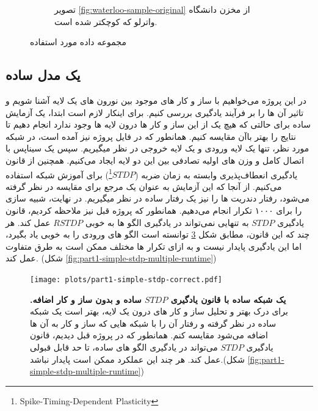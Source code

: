 \begin{figure}[H]
\begin{adjustbox}{minipage=\linewidth,scale=0.5}
\begin{subfigure}[b]{0.4\textwidth}
                    \caption{تصویر 
                    \ref{fig:waterloo-sample-original}
                    از مخزن دانشگاه واترلو که کوچکتر شده است.}
                    \label{fig:waterloo-sample-resized}
                \end{subfigure}
            \end{adjustbox}
            \caption{مجموعه داده مورد استفاده}
            \label{fig:dataset}
        \end{figure}
    \subsection{یک مدل ساده}
        در این پروژه می‌خواهیم با ساز و کار های موجود بین نورون های یک لایه آشنا شویم و تاثیر آن ها را بر فرآیند یادگیری بررسی کنیم. برای اینکار لازم است ابتدا، یک آزمایش ساده برای حالتی که هیچ یک از این ساز و کار ها درون لایه ها وجود ندارد انجام دهیم تا نتایج را بهتر با‌آن مقایسه کنیم. همانطور که در فایل پروژه نیز آمده است، در شبکه مورد نظر، تنها یک لایه ورودی و یک لایه خروجی در نظر میگیریم. سپس یک سیناپس با اتصال کامل و وزن های اولیه تصادفی بین این دو لایه ایجاد می‌کنیم. همچنین از قانون یادگیری انعطاف‌پذیری وابسته به زمان ضربه 
        ($STDP$\footnote{Spike-Timing-Dependent Plasticity})
        برای آموزش شبکه استفاده می‌کنیم. از آنجا که این آزمایش به عنوان یک مرجع برای مقایسه در نظر گرفته می‌شود، رفتار دندریت ها را نیز یک رفتار ساده در نظر میگیریم. در نهایت، شبیه سازی را برای ۱۰۰۰ تکرار انجام می‌دهیم.
        همانطور که پروژه قبل نیز ملاحظه کردیم، قانون یادگیری 
        $STDP$ 
        به تنهایی نمی‌تواند در یادگیری الگو ها به خوبی 
        $RSTDP$ 
        عمل کند. هر چند که این قانون، مطابق شکل 
        \ref{fig:part1-simple-stdp-correct} 
        توانسته است الگو های ورودی را به خوبی یاد بگیرد، اما این یادگیری پایدار نیست و به ازای تکرار ها مختلف ممکن است به طرق متفاوت عمل کند.
        (شکل \ref{fig:part1-simple-stdp-multiple-runtime})
        \begin{figure}[!ht]
            \centering
            \texttt{[image: plots/part1-simple-stdp-correct.pdf]} 
            \captionsetup{width=.9\linewidth}
            \caption{\textbf{یک شبکه ساده با قانون یادگیری 
            $STDP$ ساده و بدون ساز و کار اضافه.} برای درک بهتر و تحلیل ساز و کار های درون یک لایه، بهتر است یک شبکه ساده در نظر گرفته و رفتار آن را با شبکه هایی که ساز و کار به آن ها اضافه می‌شود مقایسه کنم. همانطور که در پروژه قبل دیدیم، قانون یادگیری 
            $STDP$ 
            می‌تواند در یادگیری الگو های ساده، تا حد قابل قبولی عمل کند. هر چند این عملکرد ممکن است پایدار نباشد.(شکل \ref{fig:part1-simple-stdp-multiple-runtime})}
            \label{fig:part1-simple-stdp-correct}
        \end{figure}

